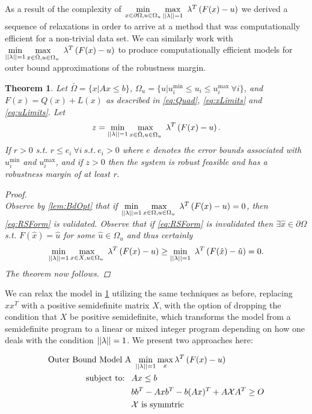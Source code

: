 \documentclass[11pt]{article}
\theoremstyle{plain}
\newtheorem{thm}{Theorem}[section]
\theoremstyle{definition}
\theoremstyle{remark}
\begin{document}
As a result of the complexity of $\min\limits_{x\in \partial \Omega, u\in\Omega_u}\max\limits_{||\bold{\lambda}||=1}\ \bold{\lambda}^T\left(F(x)-u\right)$ we derived a sequence of relaxations in order to arrive at a method that was computationally efficient for a non-trivial data set. We can similarly work with $\min\limits_{||\bold{\lambda}||=1}\max\limits_{x\in \bar{\Omega}, u\in\Omega_u}\ \bold{\lambda}^T\left(F(x)-u\right)$ to produce computationally efficient models for outer bound approximations of the robustness margin. \\
\begin{thm}\label{thm:OPTfeasOut} 
Let $\bar{\Omega}=\{x| Ax\leq b\}$, $\Omega_{u}=\{u| u^{\min}_i\leq u_i \leq u^{\max}_i \ \forall i \}$, and $F(x)=Q(x)+L(x)$ as described in \eqref{eq:Quad}, \eqref{eq:xLimits} and \eqref{eq:uLimits}. Let
$$z = \min\limits_{||\bold{\lambda}||=1}\max\limits_{x\in \bar{\Omega}, u\in\Omega_u}\ \bold{\lambda}^T\left(F(x)-u\right).$$
If $r>0$ s.t. $r\leq e_i \ \forall i \ s.t. \ e_i>0$ where $e$ denotes the error bounds associated with $ u^{\min}_i$ and $ u^{\max}_i$, and if $z>0$ then the system is robust feasible and has a robustness margin of at least r.

\begin{proof} \ \\
Observe by \cref{lem:BdOpt} that if $\min\limits_{||\bold{\lambda}||=1}\max\limits_{x\in \Omega, u\in\Omega_u}\ \bold{\lambda}^T\left(F(x)-u\right)=0$, then \eqref{eq:RSForm} is validated. Observe that if \eqref{eq:RSForm} is invalidated then $\exists \hat{x}\in\partial\Omega$ s.t. $F(\hat{x})=\hat{u}$ for some $\hat{u}\in\Omega_{u}$ and thus certainly $$\min\limits_{||\bold{\lambda}||=1}\max\limits_{x\in X, u\in\Omega_u}\ \bold{\lambda}^T\left(F(x)-u\right) \geq \min\limits_{||\bold{\lambda}||=1}\ \bold{\lambda}^T\left(F(\hat{x})-\hat{u}\right)=0.$$ The theorem now follows.
\end{proof}
\end{thm}

We can relax the model in \cref{thm:OPTfeasOut} utilizing the same techniques as before, replacing $xx^T$ with a positive semidefinite matrix $X$, with the option of dropping the condition that $X$ be positive semidefinite, which transforms the model from a semidefinite program to a linear or mixed integer program depending on how one deals with the condition $||\bold{\lambda}||=1$. We present two approaches here:

\begin{subequations}\label{eq:OPTfeasOutRelaxa}
\begin{align}
\text{Outer Bound Model A}& \ \min\limits_{||\bold{\lambda}||=1}\max\limits_{x}  \bold{\lambda}^T\left(F(x)-u\right)\\
 \text{subject to: } \ & Ax\leq b \\
 	&bb^T-Axb^T-b(Ax)^T+A\mathcal{X}A^T\geq O \\
 	&\mathcal{X} \text{ is symmtric}
\end{align}
\end{subequations}
\end{document}
